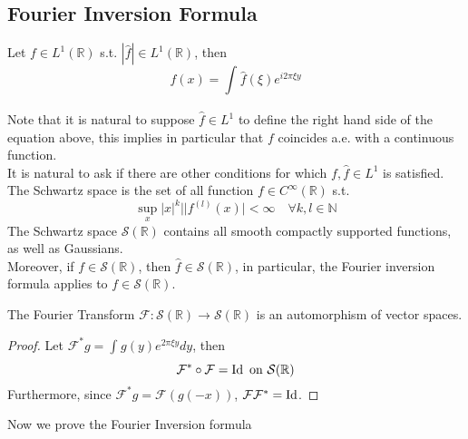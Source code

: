 \documentclass[../main.tex]{subfiles}
\begin{document}
\subsection{Fourier Inversion Formula}
Let $f\in L^{1}( \mathbb{R}) $ s.t. $ |\hat{f}| \in L^{1}( \mathbb{R}) $, then
\[ 
f( x) = \int_{  }^{  } \hat{f}( \xi) e^{i 2 \pi \xi y} 
\]
\begin{rmq}
Note that it is natural to suppose $ \hat{f}\in L^{1}$ to define the right hand side of the equation above, this implies in particular that $f$ coincides a.e. with a continuous function.\\
It is natural to ask if there are other conditions for which $f, \hat{f}\in L^{1}$  is satisfied.\\
The Schwartz space is the set of all function $f\in C^{ \infty }( \mathbb{R}) $ s.t.
\[ 
\sup_x |x|^{k}||f^{( l) }( x) | < \infty \quad \forall k , l \in \mathbb{N}
\]
The Schwartz space $ \mathcal{S}( \mathbb{R}) $ contains all smooth compactly supported functions, as well as Gaussians.\\
Moreover, if $f \in \mathcal{S}( \mathbb{R})  $, then $ \hat{f}\in \mathcal{S}( \mathbb{R})$, in particular, the Fourier inversion formula applies to $f \in \mathcal{S}( \mathbb{R}) $.
		
\end{rmq}
\begin{crly}
The Fourier Transform $ \mathcal{F}: \mathcal{S}( \mathbb{R}) \to \mathcal{S}( \mathbb{R}) $ is an automorphism of vector spaces.
\end{crly}
\begin{proof}
Let $ \mathcal{F}^{*}g = \int_{  }^{  } g( y) e^{2 \pi \xi y} dy$, then
\[ 
\mathcal{F}^{*}\circ \mathcal{F} = \operatorname{Id} \text{ on  } \mathcal{S}( \mathbb{R}) 
\]
Furthermore, since $ \mathcal{F}^{*}g = \mathcal{F}( g( -x) ) $, $\mathcal{F} \mathcal{F}^{*}= \operatorname{Id}$.

\end{proof}
Now we prove the Fourier Inversion formula
\end{document}
